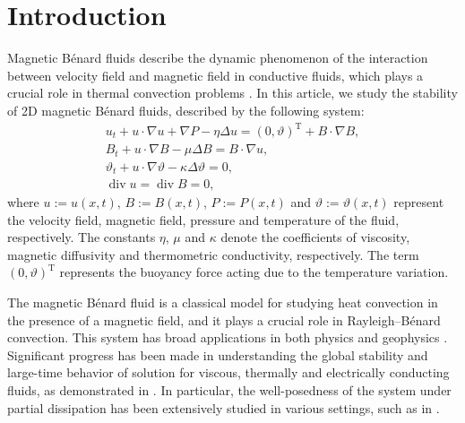 \documentclass[reqno]{amsart}
\begin{document}
 \section{Introduction}\label{sect1}

Magnetic B\'enard fluids describe the dynamic phenomenon of the interaction between velocity
field and magnetic field in conductive fluids, which plays a crucial role in thermal convection problems \cite{MR3363411,MR44996}.
In this article, we study the stability of 2D magnetic B\'enard fluids, described by the following system:
\begin{equation}\label{1.1}
\begin{gathered}
 u_t+ u\cdot \nabla u+\nabla P-\eta\Delta u= (0,\vartheta)^\mathrm{T}+ B\cdot \nabla B,\\
 B_t+u\cdot\nabla B-\mu\Delta B=B\cdot\nabla u,\\
 \vartheta_t+u\cdot \nabla \vartheta-\kappa\Delta\vartheta=0,\\
 \operatorname{div} u=\operatorname{div} B=0,
\end{gathered}
\end{equation}
where $u:=u(x,t)$, $B:=B(x,t)$, $P:=P(x,t)$ and $\vartheta:=\vartheta(x,t)$ represent the velocity field,
magnetic field, pressure and temperature of the fluid, respectively. The constants $\eta$, $\mu$ and
$\kappa$ denote the coefficients of viscosity, magnetic diffusivity and thermometric conductivity, respectively. The term $(0,\vartheta)^\mathrm{T}$ represents the buoyancy force acting due to the temperature variation.


The magnetic B\'enard fluid is a classical model for studying heat convection in the presence of
a magnetic field, and it plays a crucial role in Rayleigh--B\'enard convection. This system has broad
applications in both physics and geophysics \cite{MR53708,MR1965452}.
Significant progress has been made in understanding the global stability and large-time behavior of
solution for viscous, thermally and electrically conducting fluids, as demonstrated 
in \cite{MR3710679, MR64593,MR1107136,MR4134456,MR4505194,MR44301,MR3887133}.
In particular, the well-posedness of the system under partial dissipation has been extensively
studied in various settings, such as in 
\cite{MR4484087, MR4046053, MR3412279, MR4500250, MR3980230, MR4505194, 
MR4790886, MR4500891, MR3977115}.
\end{document}

